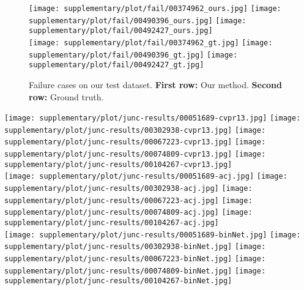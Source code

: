 \documentclass[10pt,twocolumn,letterpaper]{article}
\begin{document}
\begin{figure}[t]
	\centering
\texttt{[image: supplementary/plot/fail/00374962\_ours.jpg]}
\texttt{[image: supplementary/plot/fail/00490396\_ours.jpg]}
\texttt{[image: supplementary/plot/fail/00492427\_ours.jpg]}
\\
\texttt{[image: supplementary/plot/fail/00374962\_gt.jpg]}
\texttt{[image: supplementary/plot/fail/00490396\_gt.jpg]}
\texttt{[image: supplementary/plot/fail/00492427\_gt.jpg]}
	\caption{Failure cases on our test dataset. {\bf First row:} Our method. {\bf Second row:} Ground truth.}
	\label{fig:fail}
\end{figure}

\begin{figure*}[t]
\centering


\texttt{[image: supplementary/plot/junc-results/00051689-cvpr13.jpg]}
\texttt{[image: supplementary/plot/junc-results/00302938-cvpr13.jpg]}
\texttt{[image: supplementary/plot/junc-results/00067223-cvpr13.jpg]}
\texttt{[image: supplementary/plot/junc-results/00074809-cvpr13.jpg]}
\texttt{[image: supplementary/plot/junc-results/00104267-cvpr13.jpg]}
\\
\texttt{[image: supplementary/plot/junc-results/00051689-acj.jpg]}
\texttt{[image: supplementary/plot/junc-results/00302938-acj.jpg]}
\texttt{[image: supplementary/plot/junc-results/00067223-acj.jpg]}
\texttt{[image: supplementary/plot/junc-results/00074809-acj.jpg]}
\texttt{[image: supplementary/plot/junc-results/00104267-acj.jpg]}
\\
\texttt{[image: supplementary/plot/junc-results/00051689-binNet.jpg]}
\texttt{[image: supplementary/plot/junc-results/00302938-binNet.jpg]}
\texttt{[image: supplementary/plot/junc-results/00067223-binNet.jpg]}
\texttt{[image: supplementary/plot/junc-results/00074809-binNet.jpg]}
\texttt{[image: supplementary/plot/junc-results/00104267-binNet.jpg]}
\\


\end{figure*}
\end{document}
